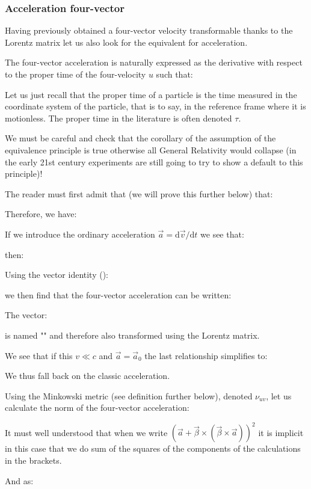 	\subsubsection{Acceleration four-vector}
	Having previously obtained a four-vector velocity transformable thanks to the Lorentz matrix let us also look for the equivalent for acceleration.

	The four-vector acceleration is naturally expressed as the derivative with respect to the proper time of the four-velocity $u$ such that:
	
	Let us just recall that the proper time of a particle is the time measured in the coordinate system of the particle, that is to say, in the reference frame where it is motionless. The proper time in the literature is often denoted $\tau$.
	\begin{tcolorbox}[title=Remark,colframe=black,arc=10pt]
	We must be careful and check that the corollary of the assumption of the equivalence principle is true otherwise all General Relativity would collapse (in the early 21st century experiments are still going to try to show a default to this principle)!
	\end{tcolorbox}	
	The reader must first admit that (we will prove this further below) that:
	
	Therefore, we have:
	
	If we introduce the ordinary acceleration $\vec{a}=\mathrm{d}\vec{v}/\mathrm{d}t$ we see that:
	
	then:
	
	Using the vector identity ():
	
	we then find that the four-vector acceleration can be written:
	
	
	The vector:
	
	is named "" and therefore also transformed using the Lorentz matrix.
	
	We see that if this $v\ll c$ and $\vec{a}=\vec{a}_0$ the last relationship simplifies to:
	
	We thus fall back on the classic acceleration.

	Using the Minkowski metric (see definition further below), denoted $\nu_{uv}$, let us calculate the norm of the four-vector acceleration:
	
	\begin{tcolorbox}[title=Remark,colframe=black,arc=10pt]
	It must well understood that when we write $(\vec{a}+\vec{\beta}\times(\vec{\beta}\times\vec{a}))^2$ it is implicit in this case that we do sum of the squares of the components of the calculations in the brackets.
	\end{tcolorbox}	
	And as:
	
